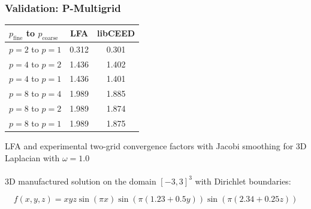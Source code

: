\documentclass{beamer}
\begin{document}
\begin{frame}
\begin{center}
\frametitle{Validation: P-Multigrid}

\begin{table}[ht!]
\begin{center}
\begin{tabular}{l c c}
  \toprule
  $p_{\text{fine}}$ to $p_{\text{coarse}}$  &  LFA  &  libCEED  \\
  \toprule
  $p = 2$ to $p = 1$   &  0.312  &  0.301  \\
  \midrule
  $p = 4$ to $p = 2$   &  1.436  &  1.402  \\
  $p = 4$ to $p = 1$   &  1.436  &  1.401  \\
  \midrule
  $p = 8$ to $p = 4$   &  1.989  &  1.885  \\
  $p = 8$ to $p = 2$   &  1.989  &  1.874  \\
  $p = 8$ to $p = 1$   &  1.989  &  1.875  \\
  \bottomrule
\end{tabular}
\end{center}
\label{table:two_grid_3d_jacobi}
\end{table}

LFA and experimental two-grid convergence factors with Jacobi smoothing for 3D Laplacian with $\omega = 1.0$\\

~\\

3D manufactured solution on the domain $\left[ -3, 3 \right]^3$ with Dirichlet boundaries:

\begin{equation}
f \left( x, y, z \right) = x y z \sin \left( \pi x \right) \sin \left( \pi \left( 1.23 + 0.5 y \right) \right) \sin \left( \pi \left( 2.34 + 0.25 z \right) \right)
\end{equation}

\end{center}
\end{frame}

\end{document}
